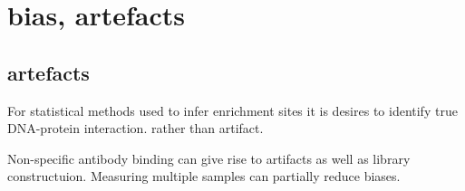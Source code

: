 \chapter{bias, artefacts}

\section{artefacts}

For statistical methods used to infer enrichment sites it is desires to identify true DNA-protein interaction. rather than artifact.

Non-specific antibody binding can give rise to artifacts as well as library constructuion.
Measuring multiple samples can partially reduce biases.
